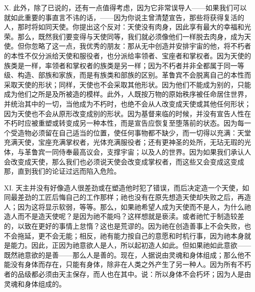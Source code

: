 X. 此外，除了已说的，还有一点值得考虑，因为它非常误导人——如果我们可以就如此重要的事直言不讳的话，——因为你说主曾清楚宣告，那些将获得复活的人，那时将如同天使。你提出这个反对：天使没有肉身，因此享有最大的幸福和光荣。那么，既然我们要变得与天使同等，我们就必须像他们一样脱去肉身，成为天使。但你忽略了这一点，我优秀的朋友：那从无中创造并安排宇宙的他，将不朽者的本性不仅分派给天使和服役者，也分派给率领者、宝座者和掌权者。因为天使的族类是一样，率领者和掌权者的族类是另一样；因为不朽者并非全都属于同一等级、构造、部族和家族，而是有族类和部族的区别。革鲁宾不会脱离自己的本性而采取天使的形状；同样，天使也不会采取其他形状。因为他们不能成为别的，只能成为他们之所是及所被造的模样。此外，人既按万物的原始秩序被任命居住世界，并统治其中的一切，当他成为不朽时，也绝不会从人改变成天使或其他任何形状；因为天使也不会从原形改变成别的形状。因为基督来临的时候，并没有宣告人性在不朽时应被重塑或转变成另一种本性，而是宣告应恢复至堕落前的状态。因为每一个受造物必须留在自己适当的位置，使任何事物都不缺少，而一切得以充满：天堂充满天使，宝座充满掌权者，光体充满服役者；还有更神圣的处所，无玷无瑕的光体，与革鲁宾一同侍奉最高议会，支撑宇宙；以及人的世界。因为如果我们承认人会改变成天使，那么我们也必须说天使会改变成掌权者，而这些又会变成这变成那，直到我们的论证过远而陷入危险。\par

XI. 天主并没有好像造人很差劲或在塑造他时犯了错误，而后决定造一个天使，如同最差劲的工匠后悔自己的工作那样；祂也没有在原先想造天使却失败之后，再造人；因为这将显示软弱，等等。那么，如果祂希望人成为天使而不是人，为什么祂造人而不是造天使呢？是因为祂不能吗？这样想就是亵渎。或者祂忙于制造较差的，以致在更好的事情上怠惰？这也是荒谬的。因为祂在创造善事上不会失败，也不会拖延，更不会无能；相反，祂有能力按自己的意愿和时机行事，因为祂本身就是能力。因此，正因为祂意欲人是人，所以起初造人如此。但如果祂如此意欲——既然祂意欲的是善——那么人是善的。现在，人据说由灵魂和身体组成；那么他不能没有身体而存在，只能有身体，除非在人类之外产生了另一种人。因为所有不朽者的品级都必须由天主保存，而人也在其中。说：所以身体不会朽坏；因为人是由灵魂和身体组成的。\par

